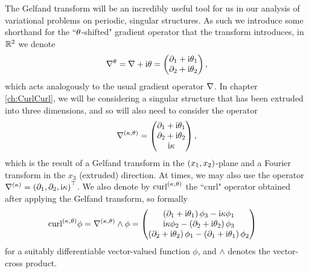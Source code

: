 The Gelfand transform will be an incredibly useful tool for us in our analysis of variational problems on periodic, singular structures.
As such we introduce some shorthand for the ``$\theta$-shifted" gradient operator that the transform introduces, in $\mathbb{R}^2$ we denote
\begin{align*}
	\nabla^{\theta} = \nabla + \mathrm{i}\theta 
	= \begin{pmatrix} \partial_1 + \mathrm{i}\theta_1 \\ \partial_2 + \mathrm{i}\theta_2 \end{pmatrix},
\end{align*}
which acts analogously to the usual gradient operator $\nabla$.
In chapter \ref{ch:CurlCurl}, we will be considering a singular structure that has been extruded into three dimensions, and so will also need to consider the operator
\begin{align*}
	\nabla^{\left( \kappa, \theta \right)} = 
	\begin{pmatrix} \partial_1 + \mathrm{i}\theta_1 \\ \partial_2 + \mathrm{i}\theta_2 \\ \mathrm{i}\kappa \end{pmatrix},
\end{align*}
which is the result of a Gelfand transform in the $\left( x_1,x_2 \right)$-plane and a Fourier transform in the $x_3$ (extruded) direction.
At times, we may also use the operator $\nabla^{(\kappa)} = \left( \partial_1, \partial_2, \mathrm{i}\kappa \right)^\top$.
We also denote by $\mathrm{curl}_{}^{\left( \kappa, \theta \right)}$ the ``curl" operator obtained after applying the Gelfand transform, so formally
\begin{align*}
	\mathrm{curl}_{}^{\left( \kappa, \theta \right)}\phi &= \nabla^{\left( \kappa, \theta \right)}\wedge\phi
	= 
	\begin{pmatrix}
		\left( \partial_1+\mathrm{i}\theta_1 \right)\phi_3 - \mathrm{i}\kappa\phi_1 \\
		\mathrm{i}\kappa\phi_2 - \left( \partial_2+\mathrm{i}\theta_2 \right)\phi_3 \\
		\left( \partial_2+\mathrm{i}\theta_2 \right)\phi_1 - \left( \partial_1+\mathrm{i}\theta_1 \right)\phi_2
	\end{pmatrix}
\end{align*}
for a suitably differentiable vector-valued function $\phi$, and $\wedge$ denotes the vector-cross product.

